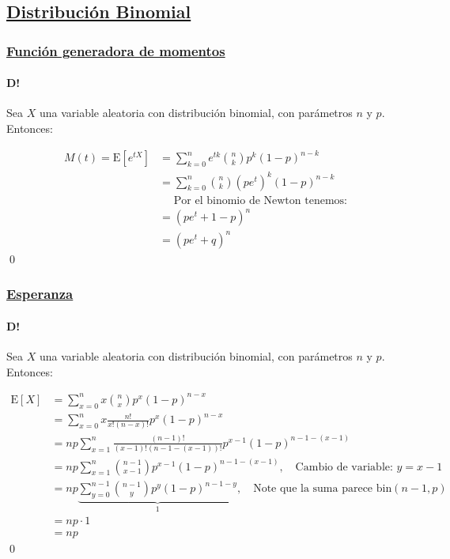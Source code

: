 \documentclass[8pt]{article}
\begin{document}
\subsection*{\hyperref[subsec:distribucion_binomial_tag]{Distribución Binomial}}
\label{subsec:distribucion_binomial}

\subsubsection*{\hyperref[subsec:funciongeneradora_binom_tag]{Función generadora de momentos}}
\label{subsec:funciongeneradora_binom}

\paragraph{D!} Sea $X$ una variable aleatoria con distribución binomial, con parámetros $n$ y $p$. Entonces:

\begin{align*}
    M(t) = \text{E}\left[e^{tX}\right] &= \sum_{k=0}^n e^{tk} \binom{n}{k} p^k (1-p)^{n-k} \\
    &= \sum_{k=0}^n \binom{n}{k} (pe^{t})^k (1-p)^{n-k} \\
    &\quad\,\, \text{Por el binomio de Newton tenemos:} \\
    &= (pe^{t} + 1-p)^n \\
    &= (pe^{t} + q)^n
\end{align*}\qed

\subsubsection*{\hyperref[subsec:esperanza_binom_tag]{Esperanza}}
\label{subsec:esperanza_binom}

\paragraph{D!} Sea $X$ una variable aleatoria con distribución binomial, con parámetros $n$ y $p$. Entonces:

\begin{align*}
    \text{E}[X] &= \sum_{x=0}^n x \binom{n}{x} p^x (1-p)^{n-x} \\
    &= \sum_{x=0}^n x \frac{n!}{x!(n-x)!} p^x (1-p)^{n-x} \\
    &= np \sum_{x=1}^n \frac{(n-1)!}{(x-1)!(n-1-(x-1))!} p^{x-1} (1-p)^{n-1-(x-1)} \\
    &= np \sum_{x=1}^n \binom{n-1}{x-1} p^{x-1} (1-p)^{n-1-(x-1)}, \quad \text{Cambio de variable: } y = x-1 \\
    &= np \underbrace{\sum_{y=0}^{n-1} \binom{n-1}{y} p^y (1-p)^{n-1-y}}_{1}, \quad \text{Note que la suma parece bin} (n-1, p) \\
    &= np \cdot 1 \\
    &= np
\end{align*}\qed
\end{document}

